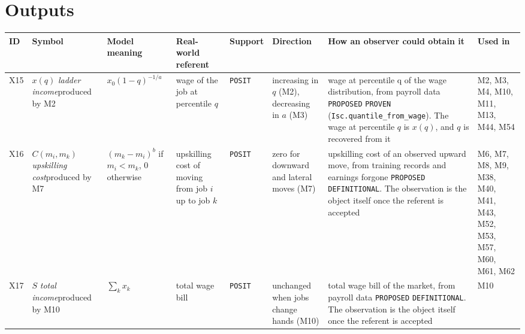 \documentclass[10pt]{article}
\begin{document}
\section{Outputs}
{\small
\begin{longtable}{>{\raggedright\arraybackslash}p{0.8cm} >{\raggedright\arraybackslash}p{2.2cm} >{\raggedright\arraybackslash}p{4.0cm} >{\raggedright\arraybackslash}p{3.6cm} >{\raggedright\arraybackslash}p{1.6cm} >{\raggedright\arraybackslash}p{4.0cm} >{\raggedright\arraybackslash}p{4.6cm} >{\raggedright\arraybackslash}p{1.8cm}}
\toprule ID & Symbol & Model meaning & Real-world referent & Support & Direction & How an observer could obtain it & Used in \\ \midrule \endhead
X15 & $x(q)$ \newline \textit{ladder income}\newline produced by M2 & $x_0(1-q)^{-1/a}$ & wage of the job at percentile $q$ & \texttt{POSIT} & increasing in $q$ (M2), decreasing in $a$ (M3) & wage at percentile q of the wage distribution, from payroll data \newline \texttt{PROPOSED} \newline \texttt{PROVEN} (\nolinkurl{Isc.quantile_from_wage}). The wage at percentile $q$ is $x(q)$, and $q$ is recovered from it & M2, M3, M4, M10, M11, M13, M44, M54 \\ \midrule
X16 & $C(m_i,m_k)$ \newline \textit{upskilling cost}\newline produced by M7 & $(m_k-m_i)^b$ if $m_i<m_k$, $0$ otherwise & upskilling cost of moving from job $i$ up to job $k$ & \texttt{POSIT} & zero for downward and lateral moves (M7) & upskilling cost of an observed upward move, from training records and earnings forgone \newline \texttt{PROPOSED} \newline \texttt{DEFINITIONAL}. The observation is the object itself once the referent is accepted & M6, M7, M8, M9, M38, M40, M41, M43, M52, M53, M57, M60, M61, M62 \\ \midrule
X17 & $S$ \newline \textit{total income}\newline produced by M10 & $\sum_k x_k$ & total wage bill & \texttt{POSIT} & unchanged when jobs change hands (M10) & total wage bill of the market, from payroll data \newline \texttt{PROPOSED} \newline \texttt{DEFINITIONAL}. The observation is the object itself once the referent is accepted & M10 \\ \midrule

\end{longtable}}
\end{document}
